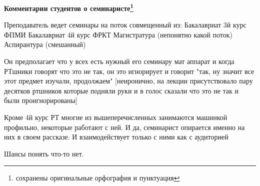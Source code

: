 		\textbf{Комментарии студентов о семинаристе\protect\footnote{сохранены оригинальные орфография и пунктуация}}
            \begin{commentbox} 
                Преподаватель ведет семинары на поток совмещенный из:
                Бакалавриат 3й курс ФПМИ
                Бакалавриат 4й курс ФРКТ
                Магистратура (непонятно какой поток)
                Аспирантура (смешанный)
        
                Он предполагает что у всех есть нужный его семинару мат аппарат и когда РТшники говорят что это не так, он это игнорирует и говорит "так, ну значит все этот предмет изучали, продолжаем" [неиронично, на лекции присутствовало пару десятков ртшников которые подняли руки и в голос сказали что это не так и были проигнорированы]
        
                Кроме 4й курс РТ многие из вышеперечисленных занимаются машинкой профильно, некоторые работают с ней. И да, семинарист опирается именно на них в своем рассказе. И взаимодействует только с ними как с аудиторией 
        
                Шансы понять что-то нет. 
            \end{commentbox}


